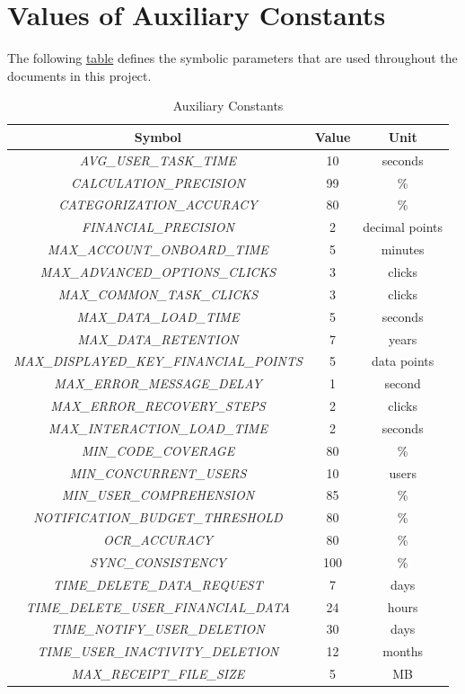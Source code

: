 \documentclass[12pt]{article}
\begin{document}
\newpage

\section{Values of Auxiliary Constants}

The following \hyperref[Table:AuxConstants]{table} defines the symbolic
parameters that are used throughout the documents in this project.

\begin{table}[H]
  \caption{Auxiliary Constants}\label{Table:AuxConstants}
  \centering
  \begin{tabular}{|c|c|c|}
    \hline
    \textbf{Symbol} & \textbf{Value} & \textbf{Unit} \\
    \hline
    \textit{AVG\_USER\_TASK\_TIME} & 10 & seconds \\
    \textit{CALCULATION\_PRECISION} & 99 & \%\\
    \textit{CATEGORIZATION\_ACCURACY} & 80 & \%\\
    \textit{FINANCIAL\_PRECISION} & 2 & decimal points\\
    \textit{MAX\_ACCOUNT\_ONBOARD\_TIME} & 5 & minutes \\
    \textit{MAX\_ADVANCED\_OPTIONS\_CLICKS} & 3 & clicks \\
    \textit{MAX\_COMMON\_TASK\_CLICKS} & 3 & clicks \\
    \textit{MAX\_DATA\_LOAD\_TIME} & 5 & seconds \\
    \textit{MAX\_DATA\_RETENTION} & 7 & years \\
    \textit{MAX\_DISPLAYED\_KEY\_FINANCIAL\_POINTS} & 5 & data points \\
    \textit{MAX\_ERROR\_MESSAGE\_DELAY} & 1 & second \\
    \textit{MAX\_ERROR\_RECOVERY\_STEPS} & 2 & clicks \\
    \textit{MAX\_INTERACTION\_LOAD\_TIME} & 2 & seconds \\
    \textit{MIN\_CODE\_COVERAGE} & 80 & \% \\
    \textit{MIN\_CONCURRENT\_USERS} & 10 & users \\
    \textit{MIN\_USER\_COMPREHENSION} & 85 & \% \\
    \textit{NOTIFICATION\_BUDGET\_THRESHOLD} & 80 & \%\\\label{NOTIFICATION_BUDGET_THRESHOLD}
    \textit{OCR\_ACCURACY} & 80 & \%\\
    \textit{SYNC\_CONSISTENCY} & 100 & \%\\
    \textit{TIME\_DELETE\_DATA\_REQUEST} & 7 & days \\
    \textit{TIME\_DELETE\_USER\_FINANCIAL\_DATA} & 24 & hours \\
    \textit{TIME\_NOTIFY\_USER\_DELETION} & 30 & days \\
    \textit{TIME\_USER\_INACTIVITY\_DELETION} & 12 & months \\
    \textit{MAX\_RECEIPT\_FILE\_SIZE} & 5 & MB \\

    \hline
  \end{tabular}
\end{table}
\end{document}
